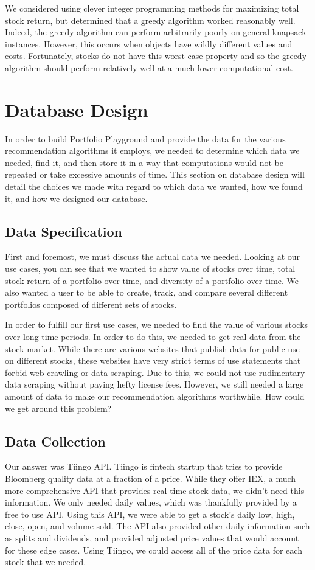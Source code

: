 \documentclass{article}
\begin{document}
We considered using clever integer programming methods for maximizing total stock return, but determined that a greedy algorithm worked reasonably well. Indeed, the greedy algorithm can perform arbitrarily poorly on general knapsack instances. However, this occurs when objects have wildly different values and costs. Fortunately, stocks do not have this worst-case property and so the greedy algorithm should perform relatively well at a much lower computational cost.

\section{Database Design} \label{sec:db}
In order to build Portfolio Playground and provide the data for the various recommendation algorithms it employs, we needed to determine which data we needed, find it, and then store it in a way that computations would not be repeated or take excessive amounts of time.  This section on database design will detail the choices we made with regard to which data we wanted, how we found it, and how we designed our database.

\subsection{Data Specification}
First and foremost, we must discuss the actual data we needed.  Looking at our use cases, you can see that we wanted to show value of stocks over time, total stock return of a portfolio over time, and diversity of a portfolio over time.  We also wanted a user to be able to create, track, and compare several different portfolios composed of different sets of stocks.  

In order to fulfill our first use cases, we needed to find the value of various stocks over long time periods.  In order to do this, we needed to get real data from the stock market.  While there are various websites that publish data for public use on different stocks, these websites have very strict terms of use statements that forbid web crawling or data scraping.  Due to this, we could not use rudimentary data scraping without paying hefty license fees.  However, we still needed a large amount of data to make our recommendation algorithms worthwhile.  How could we get around this problem?

\subsection{Data Collection}
Our answer was Tiingo API.  Tiingo is fintech startup that tries to provide Bloomberg quality data at a fraction of a price.  While they offer IEX, a much more comprehensive API that provides real time stock data, we didn’t need this information.  We only needed daily values, which was thankfully provided by a free to use API.  Using this API, we were able to get a stock’s daily low, high, close, open, and volume sold. The API also provided other daily information such as splits and dividends, and provided adjusted price values that would account for these edge cases. Using Tiingo, we could access all of the price data for each stock that we needed.
\end{document}
